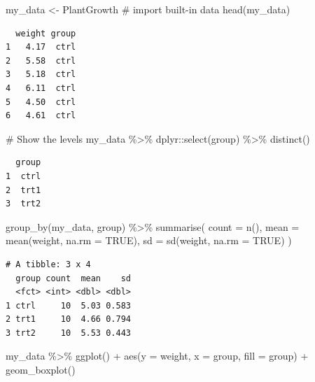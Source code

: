 \documentclass[
  letterpaper,
  DIV=11,
  numbers=noendperiod]{scrreprt}
\newenvironment{Shaded}{\begin{snugshade}}{\end{snugshade}}
\newcommand{\AttributeTok}[1]{\textcolor[rgb]{0.40,0.45,0.13}{#1}}
\newcommand{\CommentTok}[1]{\textcolor[rgb]{0.37,0.37,0.37}{#1}}
\newcommand{\ConstantTok}[1]{\textcolor[rgb]{0.56,0.35,0.01}{#1}}
\newcommand{\FunctionTok}[1]{\textcolor[rgb]{0.28,0.35,0.67}{#1}}
\newcommand{\NormalTok}[1]{\textcolor[rgb]{0.00,0.23,0.31}{#1}}
\newcommand{\OtherTok}[1]{\textcolor[rgb]{0.00,0.23,0.31}{#1}}
\newcommand{\SpecialCharTok}[1]{\textcolor[rgb]{0.37,0.37,0.37}{#1}}
\begin{document}
\begin{Shaded}
\begin{Highlighting}[]
\NormalTok{my\_data }\OtherTok{\textless{}{-}}\NormalTok{ PlantGrowth }\CommentTok{\# import built{-}in data}
\FunctionTok{head}\NormalTok{(my\_data)}
\end{Highlighting}
\end{Shaded}

\begin{verbatim}
  weight group
1   4.17  ctrl
2   5.58  ctrl
3   5.18  ctrl
4   6.11  ctrl
5   4.50  ctrl
6   4.61  ctrl
\end{verbatim}

\begin{Shaded}
\begin{Highlighting}[]
\CommentTok{\# Show the levels}
\NormalTok{my\_data }\SpecialCharTok{\%\textgreater{}\%}\NormalTok{ dplyr}\SpecialCharTok{::}\FunctionTok{select}\NormalTok{(group) }\SpecialCharTok{\%\textgreater{}\%} \FunctionTok{distinct}\NormalTok{()}
\end{Highlighting}
\end{Shaded}

\begin{verbatim}
  group
1  ctrl
2  trt1
3  trt2
\end{verbatim}

\begin{Shaded}
\begin{Highlighting}[]
\FunctionTok{group\_by}\NormalTok{(my\_data, group) }\SpecialCharTok{\%\textgreater{}\%}
  \FunctionTok{summarise}\NormalTok{(}
    \AttributeTok{count =} \FunctionTok{n}\NormalTok{(),}
    \AttributeTok{mean =} \FunctionTok{mean}\NormalTok{(weight, }\AttributeTok{na.rm =} \ConstantTok{TRUE}\NormalTok{),}
    \AttributeTok{sd =} \FunctionTok{sd}\NormalTok{(weight, }\AttributeTok{na.rm =} \ConstantTok{TRUE}\NormalTok{)}
\NormalTok{  )}
\end{Highlighting}
\end{Shaded}

\begin{verbatim}
# A tibble: 3 x 4
  group count  mean    sd
  <fct> <int> <dbl> <dbl>
1 ctrl     10  5.03 0.583
2 trt1     10  4.66 0.794
3 trt2     10  5.53 0.443
\end{verbatim}

\begin{Shaded}
\begin{Highlighting}[]
\NormalTok{my\_data }\SpecialCharTok{\%\textgreater{}\%} 
  \FunctionTok{ggplot}\NormalTok{() }\SpecialCharTok{+} 
  \FunctionTok{aes}\NormalTok{(}\AttributeTok{y =}\NormalTok{ weight, }\AttributeTok{x =}\NormalTok{ group, }
      \AttributeTok{fill =}\NormalTok{ group) }\SpecialCharTok{+} 
  \FunctionTok{geom\_boxplot}\NormalTok{()}
\end{Highlighting}
\end{Shaded}
\end{document}
